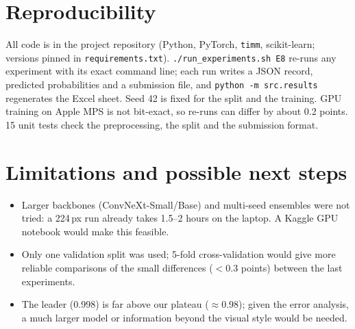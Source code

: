 \documentclass[11pt,a4paper]{article}
\newcommand{\code}[1]{\texttt{#1}}
\begin{document}
\section{Reproducibility}
All code is in the project repository (Python, PyTorch, \code{timm}, scikit-learn; versions pinned in
\code{requirements.txt}). \code{./run\_experiments.sh E8} re-runs any experiment with its exact
command line; each run writes a JSON record, predicted probabilities and a submission file, and
\code{python -m src.results} regenerates the Excel sheet. Seed 42 is fixed for the split and the
training. GPU training on Apple MPS is not bit-exact, so re-runs can differ by about 0.2 points.
15 unit tests check the preprocessing, the split and the submission format.

\section{Limitations and possible next steps}
\begin{itemize}[leftmargin=*]
\item Larger backbones (ConvNeXt-Small/Base) and multi-seed ensembles were not tried: a 224\,px run
already takes 1.5--2 hours on the laptop. A Kaggle GPU notebook would make this feasible.
\item Only one validation split was used; 5-fold cross-validation would give more reliable
comparisons of the small differences ($<0.3$ points) between the last experiments.
\item The leader (0.998) is far above our plateau ($\approx 0.98$); given the error analysis, a much
larger model or information beyond the visual style would be needed.
\end{itemize}
\end{document}
